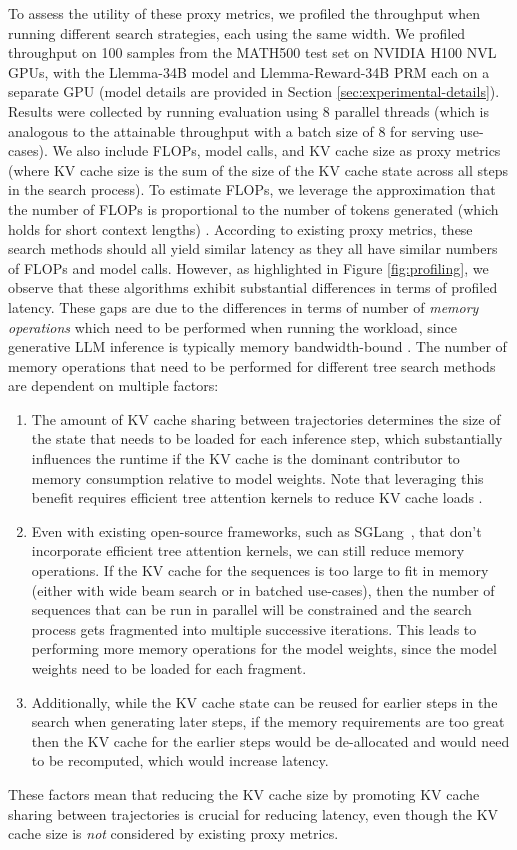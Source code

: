 To assess the utility of these proxy metrics, we profiled the throughput when running different search strategies, each using the same width.
We profiled throughput on 100 samples from the MATH500 test set on NVIDIA H100 NVL GPUs, with the Llemma-34B model and Llemma-Reward-34B PRM each on a separate GPU (model details are provided in Section \ref{sec:experimental-details}).
Results were collected by running evaluation using 8 parallel threads (which is analogous to the attainable throughput with a batch size of 8 for serving use-cases).
We also include FLOPs, model calls, and KV cache size as proxy metrics (where KV cache size is the sum of the size of the KV cache state across all steps in the search process).
To estimate FLOPs, we leverage the approximation that the number of FLOPs is proportional to the number of tokens generated (which holds for short context lengths) \cite{pope2023efficiently}.
According to existing proxy metrics, these search methods should all yield similar latency as they all have similar numbers of FLOPs and model calls.
However, as highlighted in Figure \ref{fig:profiling}, we observe that these algorithms exhibit substantial differences in terms of profiled latency.
These gaps are due to the differences in terms of number of \textit{memory operations} which need to be performed when running the workload, since generative LLM inference is typically memory bandwidth-bound \cite{kim2023full,kim2023squeezellm, hooper2024squeezed}.
The number of memory operations that need to be performed for different tree search methods are dependent on multiple factors: 

\begin{enumerate}[leftmargin=4mm]
    \item The amount of KV cache sharing between trajectories determines the size of the state that needs to be loaded for each inference step, which substantially influences the runtime if the KV cache is the dominant contributor to memory consumption relative to model weights. 
    Note that leveraging this benefit requires efficient tree attention kernels to reduce KV cache loads \cite{yao2024deft}.
    \item 
    Even with existing open-source frameworks, such as SGLang~\cite{zheng2023efficiently}, that don't incorporate efficient tree attention kernels, we can still reduce memory operations.
    If the KV cache for the sequences is too large to fit in memory (either with wide beam search or in batched use-cases), then the number of sequences that can be run in parallel will be constrained and the search process gets fragmented into multiple successive iterations. 
    This leads to performing more memory operations for the model weights, since the model weights need to be loaded for each fragment.
    \item Additionally, while the KV cache state can be reused for earlier steps in the search when generating later steps, if the memory requirements are too great then the KV cache for the earlier steps would be de-allocated and would need to be recomputed, which would increase latency.
\end{enumerate}

These factors mean that reducing the KV cache size by promoting KV cache sharing between trajectories is crucial for reducing latency, even though the KV cache size is \textit{not} considered by existing proxy metrics.